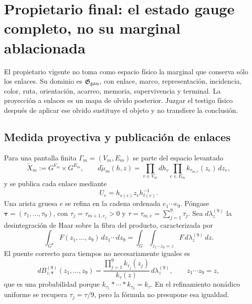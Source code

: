 \section{Propietario final: el estado gauge completo, no su marginal ablacionada}

El propietario vigente no toma como espacio físico la marginal que conserva sólo
los enlaces. Su dominio es $\mathfrak G_{\rm gau}$, con enlace, marco,
representación, incidencia, color, ruta, orientación,
acarreo, memoria, supervivencia y terminal. La proyección a enlaces es un mapa de
olvido posterior. Juzgar el testigo físico después de aplicar ese olvido sustituye el
objeto y no transfiere la conclusión.

\subsection{Medida proyectiva y publicación de enlaces}

Para una pantalla finita $\Gamma_m=(V_m,E_m)$ se parte del espacio levantado
\begin{equation}\label{eq:pdf2-ym-owner-lifted-space}
 \widetilde X_m:=G^{V_m}\times G^{E_m},\qquad
 d\widetilde\mu_m(h,z)
 =\prod_{v\in V_m}dh_v\prod_{e\in E_m}k_{\tau_{m,e}}(z_e)\,dz_e,
\end{equation}
y se publica cada enlace mediante
\begin{equation}\label{eq:pdf2-ym-owner-link-publication}
 U_e=h_{s(e)}z_eh_{t(e)}^{-1}.
\end{equation}
Una arista gruesa $e$ se refina en la cadena ordenada
$e_1\cdots e_9$. Póngase
\(\boldsymbol\tau=(\tau_1,\ldots,\tau_9)\), con
\(\tau_j=\tau_{m+1,e_j}>0\) y
\(\tau=\tau_{m,e}=\sum_{j=1}^9\tau_j\). Sea
\(d\lambda_z^{(9)}\) la desintegración de Haar sobre la fibra del producto,
caracterizada por
\[
 \int_{G^9}F(z_1,\ldots,z_9)\,dz_1\cdots dz_9
 =\int_G\int_{z_1\cdots z_9=z}
   F\,d\lambda_z^{(9)}\,dz.
\]
El puente correcto para tiempos no necesariamente iguales es
\begin{equation}\label{eq:pdf2-ym-owner-heat-bridge}
 dB_{z,\boldsymbol\tau}^{(9)}(z_1,\ldots,z_9)
 =\frac{\prod_{j=1}^9k_{\tau_j}(z_j)}{k_\tau(z)}
   \,d\lambda_z^{(9)},
 \qquad z_1\cdots z_9=z,
\end{equation}
que es una probabilidad porque
\(k_{\tau_1}*\cdots*k_{\tau_9}=k_\tau\). En el refinamiento nonádico uniforme se
recupera \(\tau_j=\tau/9\), pero la fórmula no presupone esa igualdad.

